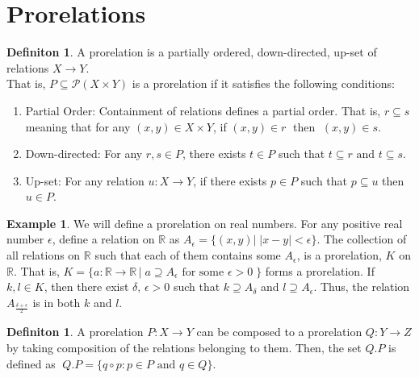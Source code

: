 \documentclass[18pt,a4paper]{article}
\theoremstyle{definition}
\newtheorem{definition}[theorem]{Definiton}
\newtheorem{example}[theorem]{Example}
\begin{document}
		\section{Prorelations}

		\begin{definition}%
			A prorelation is a partially ordered, down-directed, up-set of relations $X \to Y$.\\
			That is, $P \subseteq \mathcal{P}(X \times Y)$ is a prorelation if it satisfies the
			following conditions:
			\begin{enumerate}[label=(\roman*)]
				\item Partial Order: Containment of relations defines a partial order.
					That is, $r \subseteq s$  meaning that for any $(x,y) \in X \times Y$,
					if  $(x,y)\in r\;$ then $\;(x,y)\in s$.
				\item Down-directed: For any $r,s \in P$, there exists $t \in P $ such that
					$t\subseteq r \text{ and } t \subseteq s$.
				\item Up-set: For any relation $u:X\to Y$, if there exists $p \in P$ such that
					$p \subseteq u $ then $u \in P$.
			\end{enumerate}
		\end{definition}
\begin{example} %
	We will define a prorelation on real numbers.
	For any positive real number $\epsilon$, define a relation on $\mathbb{R}$ as
	$A_\epsilon=\{ (x,y) |\; |x-y|<\epsilon \}$.
	The collection of all relations on $\mathbb{R}$ such that each of them contains some
	$A_\epsilon$, is a prorelation, $K$ on $\mathbb{R}$.
	That is, $K=\{ a:\mathbb{R} \to \mathbb{R} \, | \; a \supseteq A_\epsilon \text{ for some } \epsilon>0 \; \}$ forms a prorelation.
	If $k,l \in K$, then there exist $\delta ,\, \epsilon > 0$ such that
	$k \supseteq A_\delta$ and $l \supseteq A_\epsilon$. Thus, the relation $A_{
	\frac{\delta+\epsilon}{2}}$ is in both $k$ and $l$.
\end{example}
		\begin{definition}%
			A prorelation $P:X \to Y$ can be composed to a prorelation $Q:Y \to Z$ by taking
			composition of the relations belonging to them. Then, the set $Q.P$ is defined as
			$\; Q.P=\{q \circ p : p \in P \text{ and } q \in Q  \}$.
		\end{definition}
\end{document}
